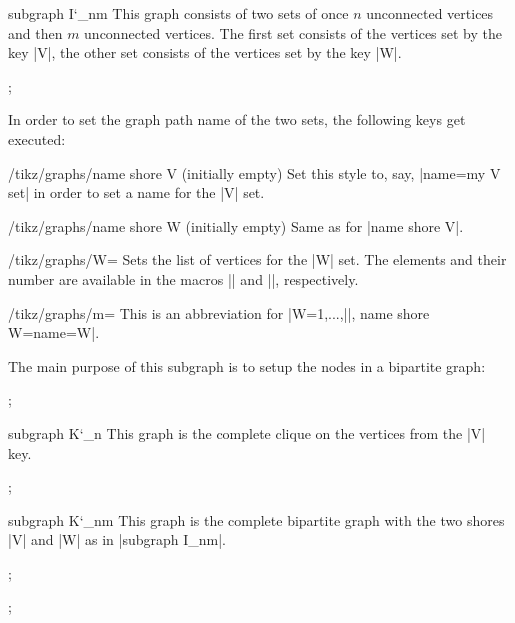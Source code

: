 \begin{graph}{subgraph I\char`\_nm}
  This graph consists of two sets of once $n$ unconnected vertices and
  then $m$ unconnected vertices. The first set consists of the
  vertices set by the key |V|, the other set consists of the vertices
  set by the key |W|.
\begin{codeexample}[]
\tikz {};    
\end{codeexample}
  In order to set the graph path name of the two
  sets, the following keys get executed:
  \begin{stylekey}{/tikz/graphs/name shore V (initially \normalfont empty)}
    Set this style to, say, |name=my V set| in order to set a
    name for the |V| set.    
  \end{stylekey}
  \begin{stylekey}{/tikz/graphs/name shore W (initially \normalfont empty)}
    Same as for |name shore V|.
  \end{stylekey}
  \begin{key}{/tikz/graphs/W=}
    Sets the list of vertices for the |W| set. The elements and
    their number are available in the macros |\tikzgraphW| and
    |\tikzgraphWnum|, respectively.
  \end{key}
  \begin{key}{/tikz/graphs/m=}
    This is an abbreviation for
    |W={1,...,||}, name shore W={name=W}|.
  \end{key}
  The main purpose of this subgraph is to setup the nodes in a
  bipartite graph:
\begin{codeexample}[]
\tikz {};    
\end{codeexample}
\end{graph}

\begin{graph}{subgraph K\char`\_n}
  This graph is the complete clique on the vertices from the |V| key. 
\begin{codeexample}[]
\tikz {};    
\end{codeexample}
\end{graph}


\begin{graph}{subgraph K\char`\_nm}
  This graph is the complete bipartite graph with the two shores |V|
  and |W| as in |subgraph I_nm|.
\begin{codeexample}[]
\tikz {};    
\end{codeexample}
\begin{codeexample}[]
\tikz {};    
\end{codeexample}
\end{graph}

